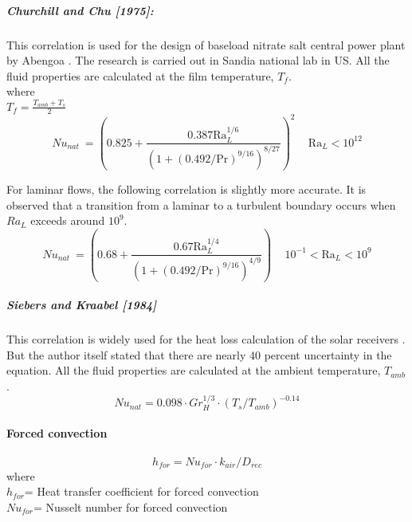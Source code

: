\subparagraph{Churchill and Chu [1975]:}
This correlation is used for the design of baseload nitrate salt central power plant by Abengoa \cite{Tilley.2014}. The research is carried out in Sandia national lab in US. All the fluid properties are calculated at the film temperature, $T_f$.\\


where\\
$T_f = \frac{T_{amb}+T_s}{2}$\\

\begin{equation}
{Nu_{nat}} \ = \left({0.825 + \frac{0.387 \mathrm{Ra}_L^{1/6}}{\left(1 + (0.492/\mathrm{Pr})^{9/16} \right)^{8/27} }}\right)^2 \, \quad \mathrm{Ra}_L < 10^{12}
\end{equation}


For laminar flows, the following correlation is slightly more accurate. It is observed that a transition from a laminar to a turbulent boundary occurs when $Ra_{L}$ exceeds around $10^{9}$.\\

\begin{equation}
{Nu_{nat}} \ = \left(0.68 + \frac{0.67 \mathrm{Ra}_L^{1/4}}{\left(1 + (0.492/\mathrm{Pr})^{9/16}\right)^{4/9}}\right) \, \quad \mathrm10^{-1} < \mathrm{Ra}_L < 10^9 
\end{equation}


\subparagraph{Siebers and Kraabel [1984] \cite{Siebers.1984}}
This correlation is widely used for the heat loss calculation of the solar receivers \cite{Christian.2012}. But the author itself stated that there are nearly 40 percent uncertainty in the equation. All the fluid properties are calculated at the ambient temperature, $T_{amb}$.\\
\begin{equation}
Nu_{nat}=0.098\cdot Gr_H^{1/3}\cdot(T_s/T_{amb})^{-0.14}
\end{equation}
\paragraph{Forced convection}
\begin{equation}
h_{for}=Nu_{for}\cdot k_{air}/D_{rec}
\end{equation}
where\\
$h_{for}$= Heat transfer coefficient for forced convection\\
$Nu_{for}$= Nusselt number for forced convection\\

